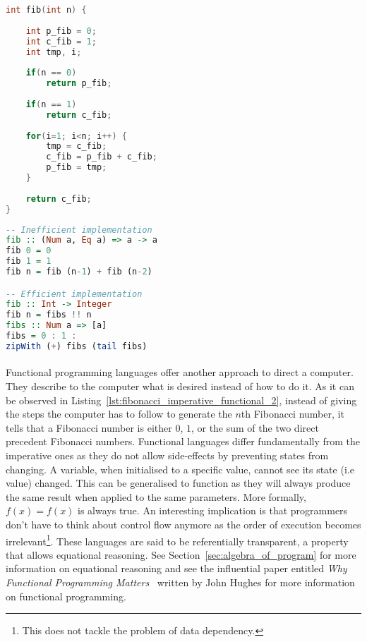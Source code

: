 \noindent\begin{minipage}{.45\textwidth}
	\begin{lstlisting}[caption={Fibonacci written in C}, label={lst:fibonacci_imperative_functional_1}, frame=tlrb, language=C]
int fib(int n) {
	
	int p_fib = 0;
	int c_fib = 1;
	int tmp, i;
	
	if(n == 0)
		return p_fib;
	
	if(n == 1)
		return c_fib;
	
	for(i=1; i<n; i++) {
		tmp = c_fib;
		c_fib = p_fib + c_fib;
		p_fib = tmp;
	}
	
	return c_fib;
}
	\end{lstlisting}
\end{minipage}\hfill
\begin{minipage}{.45\textwidth}
	\begin{lstlisting}[caption={Fibonacci written in Haskell}, label={lst:fibonacci_imperative_functional_2}, frame=tlrb, language={haskell}]
-- Inefficient implementation		
fib :: (Num a, Eq a) => a -> a
fib 0 = 0
fib 1 = 1
fib n = fib (n-1) + fib (n-2)

-- Efficient implementation
fib :: Int -> Integer
fib n = fibs !! n
fibs :: Num a => [a]
fibs = 0 : 1 : 
zipWith (+) fibs (tail fibs)
	\end{lstlisting}
\end{minipage}

\paragraph{}  
Functional programming languages offer another approach to direct a computer. They describe to the computer what is desired instead of how to do it. As it can be observed in Listing~\ref{lst:fibonacci_imperative_functional_2}, instead of giving the steps the computer has to follow to generate the $n$th Fibonacci number, it tells that a Fibonacci number is either $0$, $1$, or the sum of the two direct precedent Fibonacci numbers. Functional languages differ fundamentally from the imperative ones as they do not allow side-effects by preventing states from changing. A variable, when initialised to a specific value, cannot see its state (i.e value) changed. This can be generalised to function as they will always produce the same result when applied to the same parameters. More formally, $f(x) = f(x)$ is always true. An interesting implication is that programmers don't have to think about control flow anymore as the order of execution becomes irrelevant\footnote{This does not tackle the problem of data dependency.}. These languages are said to be referentially transparent, a property that allows equational reasoning. See Section~\ref{sec:algebra_of_program} for more information on equational reasoning and see the influential paper entitled \textit{Why Functional Programming Matters}~\cite{hughes1989functional} written by John Hughes for more information on functional programming.

